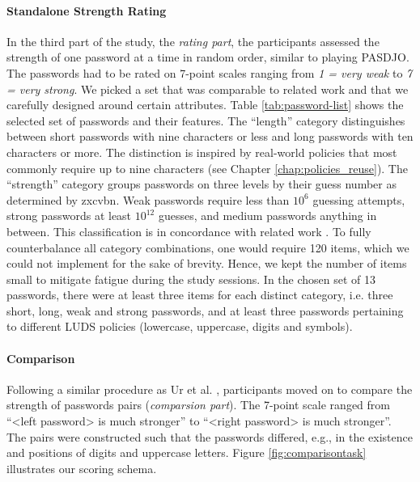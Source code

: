 \paragraph{Standalone Strength Rating} In the third part of the study, the \textit{rating part}, the participants assessed the strength of one password at a time in random order, similar to playing PASDJO. The passwords had to be rated on 7-point scales ranging from \textit{1 = very weak} to \textit{7 = very strong}. We picked a set that was comparable to related work \cite{Ur2016PerceptionsPassword} and that we carefully designed around certain attributes. Table \ref{tab:password-list} shows the selected set of passwords and their features. The ``length'' category distinguishes between short passwords with nine characters or less and long passwords with ten characters or more. The distinction is inspired by real-world policies that most commonly require up to nine characters (see Chapter \ref{chap:policies_reuse}). The ``strength'' category groups passwords on three levels by their guess number as determined by zxcvbn. Weak passwords require less than $10^{6}$ guessing attempts, strong passwords at least $10^{12}$ guesses, and medium passwords anything in between. This classification is in concordance with related work \cite{Florencio2014AdministratorsGuide, Wheeler2016zxcvbn} . To fully counterbalance all category combinations, one would require 120 items, which we could not implement for the sake of brevity. Hence, we kept the number of items small to mitigate fatigue during the study sessions. In the chosen set of 13 passwords, there were at least three items for each distinct category, i.e. three short, long, weak and strong passwords, and at least three passwords pertaining to different LUDS policies (lowercase, uppercase, digits and symbols).

\paragraph{Comparison} Following a similar procedure as Ur et al. \cite{Ur2016PerceptionsPassword}, participants moved on to compare the strength of passwords pairs (\textit{comparsion part}). The 7-point scale ranged from ``<left password> is much stronger'' to ``<right password> is much stronger''. The pairs were constructed such that the passwords differed, e.g., in the existence and positions of digits and uppercase letters. Figure \ref{fig:comparisontask} illustrates our scoring schema. 

